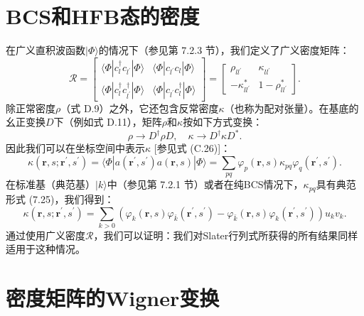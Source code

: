 \section{BCS和HFB态的密度}

在广义直积波函数$|\Phi\rangle$的情况下（参见第 7.2.3 节），我们定义了广义密度矩阵：
\begin{equation}
\mathcal{R}=\begin{bmatrix}\langle\Phi|c^{\dagger}_{l}c_{l^{\prime}}|\Phi\rangle & \langle\Phi|c_{l^{\prime}}c_{l}|\Phi\rangle\\
\langle\Phi|c^{\dagger}_{l}c^{\dagger}_{l^{\prime}}|\Phi\rangle & \langle\Phi|c_{l^{\prime}}c^{\dagger}_{l}|\Phi\rangle
\end{bmatrix}=\begin{bmatrix}\rho_{ll^{\prime}} & \kappa_{ll^{\prime}}\\
-\kappa^{*}_{ll^{\prime}} & 1-\rho^{*}_{ll^{\prime}}
\end{bmatrix}.\label{eq:appendix_d_generalized_density}
\end{equation}
除正常密度$\rho$（式 D.9）之外，它还包含反常密度$\kappa$（也称为配对张量）。在基底的幺正变换$D$下（例如式
D.11），矩阵$\rho$和$\kappa$按如下方式变换：
\begin{equation}
\rho\to D^{\dagger}\rho D,\quad\kappa\to D^{\dagger}\kappa D^{*}.\label{eq:appendix_d_rho_kappa_transform}
\end{equation}
因此我们可以在坐标空间中表示$\kappa$ {[}参见式 (C.26){]}：
\begin{equation}
\kappa(\boldsymbol{r},s;\boldsymbol{r}^{\prime},s^{\prime})=\langle\Phi|a(\boldsymbol{r}^{\prime},s^{\prime})a(\boldsymbol{r},s)|\Phi\rangle=\sum_{pq}\varphi_{p}(\boldsymbol{r},s)\kappa_{pq}\varphi_{q}(\boldsymbol{r}^{\prime},s^{\prime}).\label{eq:appendix_d_kappa_coord}
\end{equation}
在标准基（典范基）$|k\rangle$中（参见第 7.2.1 节）或者在纯BCS情况下，$\kappa_{pq}$具有典范形式
(7.25)，我们得到：
\begin{equation}
\kappa(\boldsymbol{r},s;\boldsymbol{r}^{\prime},s^{\prime})=\sum_{k>0}(\varphi_{k}(\boldsymbol{r},s)\varphi_{\bar{k}}(\boldsymbol{r}^{\prime},s^{\prime})-\varphi_{\bar{k}}(\boldsymbol{r},s)\varphi_{k}(\boldsymbol{r}^{\prime},s^{\prime}))u_{k}v_{k}.\label{eq:appendix_d_kappa_canonical}
\end{equation}
通过使用广义密度$\mathcal{R}$，我们可以证明：我们对Slater行列式所获得的所有结果同样适用于这种情况。

\section{密度矩阵的Wigner变换}

